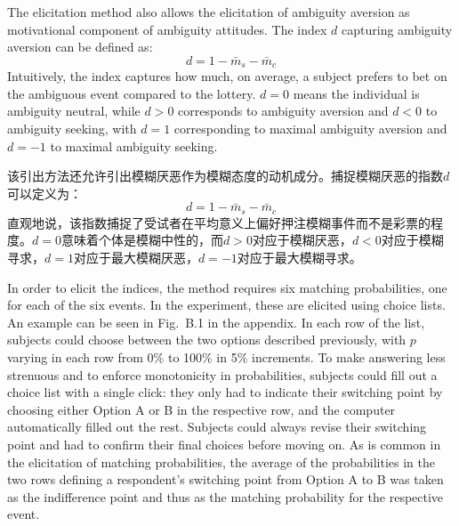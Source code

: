 \documentclass[12pt,a4paper]{article}
\newenvironment{original}
  {\par\medskip\noindent\color{black}\ignorespaces}
  {\par\medskip}
\newenvironment{translation}
  {\par\noindent\color{transblue}\ignorespaces}
  {\par\medskip\medskip}
\begin{document}
\begin{original}
The elicitation method also allows the elicitation of ambiguity aversion as motivational component of ambiguity attitudes. The index $d$ capturing ambiguity aversion can be defined as:
\begin{equation}
d = 1 - \bar{m}_s - \bar{m}_c \label{eq:7}
\end{equation}
Intuitively, the index captures how much, on average, a subject prefers to bet on the ambiguous event compared to the lottery. $d = 0$ means the individual is ambiguity neutral, while $d > 0$ corresponds to ambiguity aversion and $d < 0$ to ambiguity seeking, with $d = 1$ corresponding to maximal ambiguity aversion and $d = -1$ to maximal ambiguity seeking.
\end{original}

\begin{translation}
该引出方法还允许引出模糊厌恶作为模糊态度的动机成分。捕捉模糊厌恶的指数$d$可以定义为：
\begin{equation}
d = 1 - \bar{m}_s - \bar{m}_c
\end{equation}
直观地说，该指数捕捉了受试者在平均意义上偏好押注模糊事件而不是彩票的程度。$d = 0$意味着个体是模糊中性的，而$d > 0$对应于模糊厌恶，$d < 0$对应于模糊寻求，$d = 1$对应于最大模糊厌恶，$d = -1$对应于最大模糊寻求。
\end{translation}

\begin{original}
In order to elicit the indices, the method requires six matching probabilities, one for each of the six events. In the experiment, these are elicited using choice lists. An example can be seen in Fig.\ B.1 in the appendix. In each row of the list, subjects could choose between the two options described previously, with $p$ varying in each row from 0\% to 100\% in 5\% increments. To make answering less strenuous and to enforce monotonicity in probabilities, subjects could fill out a choice list with a single click: they only had to indicate their switching point by choosing either Option A or B in the respective row, and the computer automatically filled out the rest. Subjects could always revise their switching point and had to confirm their final choices before moving on. As is common in the elicitation of matching probabilities, the average of the probabilities in the two rows defining a respondent's switching point from Option A to B was taken as the indifference point and thus as the matching probability for the respective event.
\end{original}
\end{document}

